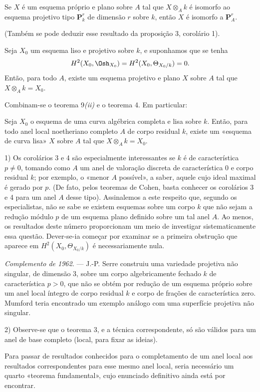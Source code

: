  Se $X$ é um esquema próprio e plano sobre $A$ tal que
$X\otimes_A k$ é isomorfo ao esquema projetivo tipo $\mathbf P_k^r$ de
dimensão $r$ sobre $k$, então $X$ é isomorfo a $\mathbf P_A^r$.

(Também se pode deduzir esse resultado da proposição 3, corolário 1).

 Seja $X_0$ um esquema liso e projetivo sobre $k$, e
suponhamos que se tenha
\[
  H^2(X_0,\Osh_{X_0})=H^2(X_0,\Theta_{X_0/k})=0.
\]
Então, para todo $A$, existe um esquema projetivo e plano $X$ sobre $A$ tal
que $X\otimes_A k=X_0$.

Combinam-se o teorema 9\textit{(ii)} e o teorema 4. Em particular:

 Seja $X_0$ o esquema de uma curva algébrica completa e
lisa sobre $k$. Então, para todo anel local noetheriano completo $A$ de
corpo residual $k$, existe um «esquema de curva lisa» $X$ sobre $A$ tal que
$X\otimes_A k=X_0$.


1) Os corolários 3 e 4 são especialmente interessantes se $k$ é de
característica $p\ne0$, tomando como $A$ um anel de valoração discreta de
característica $0$ e corpo residual $k$; por exemplo, o «menor $A$ possível»,
a saber, aquele cujo ideal maximal é gerado por $p$. (De fato, pelos
teoremas de Cohen, basta conhecer os corolários 3 e 4 para um anel $A$ desse
tipo). Assinalemos a este respeito que, segundo os especialistas, não se sabe se
existem esquemas sobre um corpo $k$ que não sejam a redução módulo $p$ de um
esquema plano definido sobre um tal anel $A$. Ao menos, os resultados deste
número proporcionam um meio de investigar sistematicamente essa questão. Dever-se-ia
começar por examinar se a primeira obstrução que aparece em
$H^2(X_0,\Theta_{X_0/k})$ é necessariamente nula.

\emph{Complemento de 1962.} --- J.-P. Serre construiu uma variedade
projetiva não singular, de dimensão 3, sobre um corpo algebricamente fechado
$k$ de característica $p>0$, que não se obtém por redução de um esquema
próprio sobre um anel local íntegro de corpo residual $k$ e corpo de
frações de característica zero. Mumford teria encontrado um exemplo análogo
com uma superfície projetiva não singular.

2) Observe-se que o teorema 3, e a técnica correspondente, só são válidos para
um anel de base completo (local, para fixar as ideias).

Para passar de resultados conhecidos para o completamento de um anel local aos
resultados correspondentes para esse mesmo anel local, seria necessário um
quarto «teorema fundamental», cujo enunciado definitivo ainda está por encontrar.

